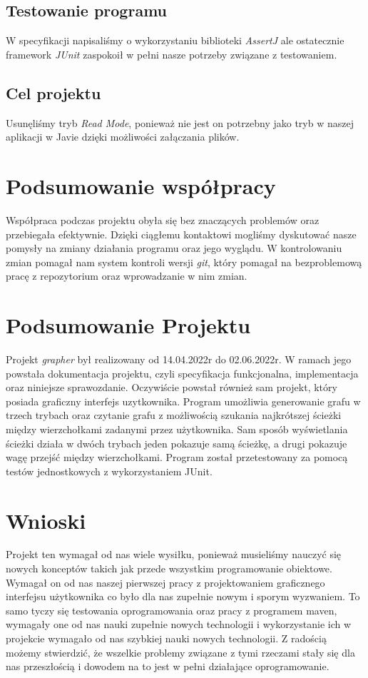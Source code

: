 \documentclass[10pt, a4paper]{report}
\begin{document}
\subsection{Testowanie programu}\label{subsec:testowanie-programu}
W specyfikacji napisaliśmy o wykorzystaniu biblioteki \textit{AssertJ} ale
ostatecznie framework \textit{JUnit} zaspokoił w pełni nasze potrzeby związane
z testowaniem.

\subsection{Cel projektu}\label{subsec:cel-projektu}
Usunęliśmy tryb \textit{Read Mode}, ponieważ nie jest on potrzebny jako tryb w naszej aplikacji w Javie dzięki możliwości załączania plików.

\section{Podsumowanie współpracy}\label{sec:podsumowanie-współpracy}
Współpraca podczas projektu obyła się bez znaczących problemów oraz przebiegała
efektywnie.
Dzięki ciągłemu kontaktowi mogliśmy dyskutować nasze pomysły na zmiany
działania programu oraz jego wyglądu.
W kontrolowaniu zmian pomagał nam system kontroli wersji \textit{git}, który
pomagał na bezproblemową pracę z repozytorium oraz wprowadzanie w nim zmian.

\section{Podsumowanie Projektu}\label{sec:podsumowanie-projektu}
Projekt \textit{grapher} był realizowany od 14.04.2022r do 02.06.2022r. W
ramach jego powstała dokumentacja projektu, czyli
specyfikacja funkcjonalna, implementacja oraz niniejsze sprawozdanie.
Oczywiście powstał również sam projekt, który posiada graficzny interfejs
uzytkownika.
Program umożliwia generowanie grafu w trzech trybach oraz czytanie grafu z
możliwością szukania najkrótszej ścieżki między wierzchołkami zadanymi przez
użytkownika.
Sam sposób wyświetlania ścieżki działa w dwóch trybach jeden pokazuje samą
ścieżkę, a drugi pokazuje wagę przejść między wierzchołkami. Program został
przetestowany za pomocą testów
jednostkowych z wykorzystaniem JUnit.

\section{Wnioski}\label{sec:wnioski}
Projekt ten wymagał od nas wiele wysiłku, ponieważ musieliśmy nauczyć się
nowych konceptów takich jak przede wszystkim
programowanie obiektowe. Wymagał on od nas naszej pierwszej pracy z
projektowaniem graficznego interfejsu użytkownika co było dla nas zupełnie
nowym i sporym wyzwaniem.
To samo tyczy się testowania oprogramowania oraz pracy z programem maven,
wymagały one od nas nauki zupełnie nowych technologii i wykorzystanie ich w
projekcie wymagało od nas
szybkiej nauki nowych technologii. Z radością możemy stwierdzić, że wszelkie
problemy związane z tymi rzeczami stały się dla nas przeszłością i dowodem na
to jest w pełni działające
oprogramowanie.
\end{document}
